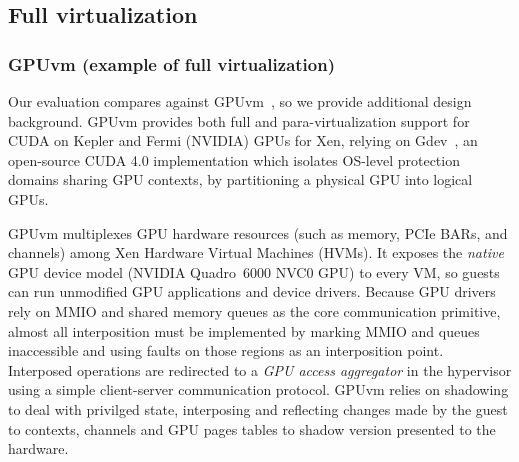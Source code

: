 \subsection{Full virtualization}


\subsubsection{GPUvm (example of full virtualization)} \label{sec:gpuvm}

Our evaluation compares \Trillium
against GPUvm~\cite{GPUvm}, so we provide additional design background.
GPUvm provides both full and para-virtualization support for
CUDA on Kepler and Fermi (NVIDIA) GPUs for Xen, relying on
Gdev~\cite{kato2012gdev}, an open-source CUDA 4.0
implementation which isolates OS-level protection domains sharing GPU contexts,
by partitioning a physical GPU into logical GPUs.

GPUvm
multiplexes GPU hardware resources (such as memory, PCIe BARs, and
channels)  among Xen Hardware Virtual Machines (HVMs).
It exposes the \emph{native} GPU device model (NVIDIA
Quadro~6000 NVC0 GPU) to every VM, so guests can run
unmodified GPU applications and device drivers. Because GPU drivers rely
on MMIO and shared memory queues as the core communication primitive,
almost all interposition must be implemented by marking MMIO and queues
inaccessible and using faults on those regions as an interposition point.
Interposed operations are redirected to a \emph{GPU access
	aggregator} in the hypervisor using a simple client-server communication protocol.
GPUvm relies on shadowing to deal with privilged state, interposing and reflecting changes
made by the guest to contexts, channels and GPU pages tables to shadow
version presented to the hardware.


